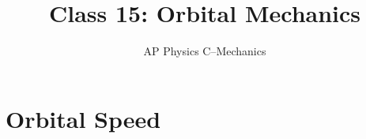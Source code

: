 \documentclass[12pt,compress,aspectratio=169]{beamer}
\title{Class 15: Orbital Mechanics}
\subtitle{AP Physics C--Mechanics}
\begin{document}
\begin{frame}
  \maketitle
\end{frame}


\section{Orbital Speed}

\end{document}
